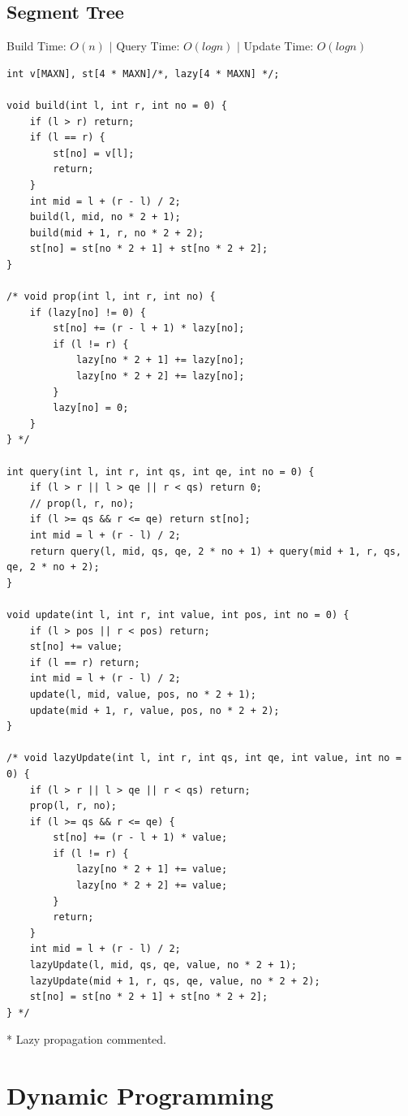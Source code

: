 \documentclass[oneside]{article}
\begin{document}
\subsection{Segment Tree}
Build Time: $O(n)$ $|$ Query Time: $O(logn)$ $|$ Update Time: $O(logn)$
\begin{lstlisting}
int v[MAXN], st[4 * MAXN]/*, lazy[4 * MAXN] */;

void build(int l, int r, int no = 0) {
    if (l > r) return;
    if (l == r) {
        st[no] = v[l];
        return;
    }
    int mid = l + (r - l) / 2;
    build(l, mid, no * 2 + 1);
    build(mid + 1, r, no * 2 + 2);
    st[no] = st[no * 2 + 1] + st[no * 2 + 2];
}

/* void prop(int l, int r, int no) {
    if (lazy[no] != 0) {
        st[no] += (r - l + 1) * lazy[no];
        if (l != r) {
            lazy[no * 2 + 1] += lazy[no];
            lazy[no * 2 + 2] += lazy[no];
        }
        lazy[no] = 0;
    }
} */

int query(int l, int r, int qs, int qe, int no = 0) {    
    if (l > r || l > qe || r < qs) return 0;
    // prop(l, r, no);
    if (l >= qs && r <= qe) return st[no];
    int mid = l + (r - l) / 2;
    return query(l, mid, qs, qe, 2 * no + 1) + query(mid + 1, r, qs, qe, 2 * no + 2);
}

void update(int l, int r, int value, int pos, int no = 0) {
    if (l > pos || r < pos) return;
    st[no] += value;
    if (l == r) return;
    int mid = l + (r - l) / 2;
    update(l, mid, value, pos, no * 2 + 1);
    update(mid + 1, r, value, pos, no * 2 + 2);
}

/* void lazyUpdate(int l, int r, int qs, int qe, int value, int no = 0) {
    if (l > r || l > qe || r < qs) return;
    prop(l, r, no);
    if (l >= qs && r <= qe) {
        st[no] += (r - l + 1) * value;
        if (l != r) {
            lazy[no * 2 + 1] += value;
            lazy[no * 2 + 2] += value;
        }
        return;
    }
    int mid = l + (r - l) / 2;
    lazyUpdate(l, mid, qs, qe, value, no * 2 + 1);
    lazyUpdate(mid + 1, r, qs, qe, value, no * 2 + 2);
    st[no] = st[no * 2 + 1] + st[no * 2 + 2];
} */
\end{lstlisting}
* Lazy propagation commented.
\pagebreak
\section{Dynamic Programming}
\end{document}
